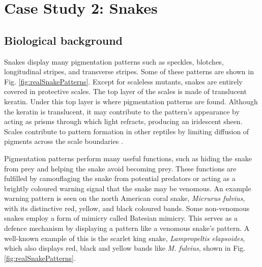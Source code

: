 

\chapter{Case Study 2: Snakes}

\section{Biological background}
Snakes display many pigmentation patterns such as speckles, blotches, longitudinal stripes, and transverse stripes. Some of these patterns are shown in Fig. \ref{fig:realSnakePatterns}. Except for scaleless mutants, snakes are entirely covered in protective scales. The top layer of the scales is made of translucent keratin. Under this top layer is where pigmentation patterns are found. Although the keratin is translucent, it may contribute to the pattern's appearance by acting as prisms through which light refracts, producing an iridescent sheen. Scales contribute to pattern formation in other reptiles by limiting diffusion of pigments across the scale boundaries \citep{manukyan2017}.

Pigmentation patterns perform many useful functions, such as hiding the snake from prey and helping the snake avoid becoming prey. These functions are fulfilled by camouflaging the snake from potential predators or acting as a brightly coloured warning signal that the snake may be venomous. An example warning pattern is seen on the north American coral snake, \textit{Micrurus fulvius}, with its distinctive red, yellow, and black coloured bands. Some non-venomous snakes employ a form of mimicry called Batesian mimicry. This serves as a defence mechanism by displaying a pattern like a venomous snake's pattern. A well-known example of this is the scarlet king snake, \textit{Lampropeltis elapsoides}, which also displays red, black and yellow bands like \textit{M. fulvius}, shown in Fig. \ref{fig:realSnakePatterns}.

